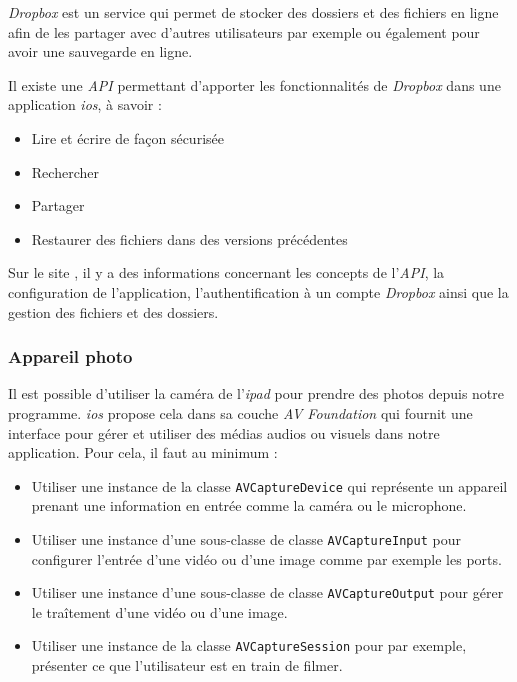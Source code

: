\emph{Dropbox} est un service qui permet de stocker des dossiers et des fichiers en ligne afin de les partager avec d'autres utilisateurs par exemple ou également pour avoir une sauvegarde en ligne.

\medskip

Il existe une \emph{API} permettant d'apporter les fonctionnalités de \emph{Dropbox} dans une application \emph{\gls{ios}}, à savoir :

\medskip

\begin{itemize}
  \item Lire et écrire de façon sécurisée
  \item Rechercher
  \item Partager
  \item Restaurer des fichiers dans des versions précédentes
\end{itemize}

\medskip

Sur le site \cite{online:dropapi}, il y a des informations concernant les concepts de l'\emph{API}, la configuration de l'application, l'authentification à un compte \emph{Dropbox} ainsi que la gestion des fichiers et des dossiers. 


\subsubsection{Appareil photo}
Il est possible d'utiliser la caméra de l'\emph{\gls{ipad}} pour prendre des photos depuis notre programme. \emph{\gls{ios}} propose cela dans sa couche \emph{AV Foundation} qui fournit une interface pour gérer et utiliser des médias audios ou visuels dans notre application. Pour cela, il faut au minimum : 

\medskip

\begin{itemize}
	\item Utiliser une instance de la classe \texttt{AVCaptureDevice} qui représente un appareil prenant une information en entrée comme la caméra ou le microphone.
	\item Utiliser une instance d'une sous-classe de classe \texttt{AVCaptureInput} pour configurer l'entrée d'une vidéo ou d'une image comme par exemple les ports.
	\item Utiliser une instance d'une sous-classe de classe \texttt{AVCaptureOutput} pour gérer le traîtement d'une vidéo ou d'une image.
	\item Utiliser une instance de la classe \texttt{AVCaptureSession} pour par exemple, présenter ce que l'utilisateur est en train de filmer.
\end{itemize}

